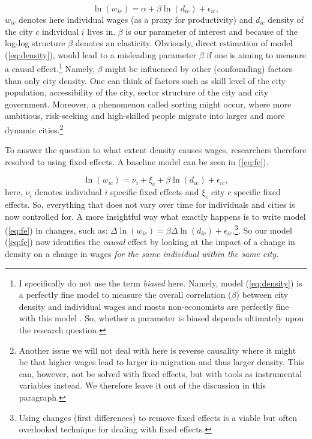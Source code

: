 \documentclass[fleqn,10pt]{SelfArx} %
\begin{document}
\begin{equation}
  \label{eq:density}
  \ln(w_{ic}) = \alpha + \beta \ln(d_{ic})+\epsilon_{ic},
\end{equation}
$w_{ic}$ denotes here individual wages (as a proxy for productivity) and
$d_{ic}$ density of the city $c$ individual $i$ lives in. $\beta$ is our
parameter of interest and because of the log-log structure $\beta$ denotes an
elasticity. Obviously, direct
estimation of model (\ref{eq:density}), would lead to a misleading parameter
$\beta$ if one is aiming to measure a causal effect.\footnote{I specifically do not use
the term \emph{biased} here. Namely, model (\ref{eq:density}) is a perfectly fine
model to measure the overall correlation ($\beta$) between city density and individual
wages and mosts non-economists are perfectly fine with this model
\citep[see, e.g.,][]{bettencourt2010unified}. So, whether a parameter is biased depends ultimately upon the research question.}
Namely, $\beta$ might be influenced by other (confounding) factors than only city density. One
can think of factors such as skill level of the city population, accessibility of the city,
sector structure of the city and city government. Moreover, a phenomenon called
sorting might occur, where more ambitious, risk-seeking and high-skilled people
migrate into larger and more dynamic cities.\footnote{Another issue we will not
  deal with here is reverse causality where it might be that higher wages lead
  to larger in-migration and thus larger density. This can, however, not be solved
with fixed effects, but with tools as instrumental variables instead. We
therefore leave it out of the discussion in this paragraph.}

To answer the question to what extent density causes wages, researchers
therefore resolved to using fixed effects. A baseline model can be seen in
(\ref{eq:fe}). 

\begin{equation}
  \label{eq:fe}
  \ln(w_{ic}) = \nu_i + \xi_c + \beta \ln(d_{ic})+\epsilon_{ic},
\end{equation}
here, $\nu_i$ denotes individual $i$ specific fixed effects and $\xi_c$ city $c$
specific fixed effects. So, everything that does not vary over time for
individuals and cities is now controlled for. A more insightful way what exactly
happens is to write model (\ref{eq:fe}) in changes, such as: $\Delta \ln(w_{ic}) =
\beta \Delta\ln( d_{ic}) + \epsilon_{ic}$.\footnote{Using changes (first differences)
to remove fixed effects is a viable but often overlooked technique for dealing
with fixed effects.}. So our model (\ref{eq:fe}) now identifies the
\emph{causal} effect by looking at the impact of a change in density on a change
in wages \emph{for the same individual within the same city}.
\end{document}
